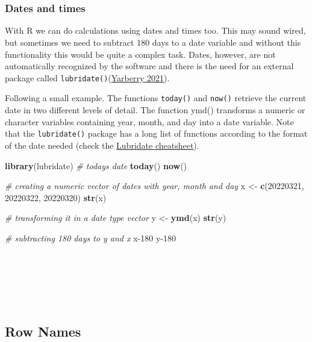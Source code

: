 \documentclass[
]{article}
\newenvironment{Shaded}{\begin{snugshade}}{\end{snugshade}}
\newcommand{\CommentTok}[1]{\textcolor[rgb]{0.56,0.35,0.01}{\textit{#1}}}
\newcommand{\DecValTok}[1]{\textcolor[rgb]{0.00,0.00,0.81}{#1}}
\newcommand{\FunctionTok}[1]{\textcolor[rgb]{0.13,0.29,0.53}{\textbf{#1}}}
\newcommand{\NormalTok}[1]{#1}
\newcommand{\OtherTok}[1]{\textcolor[rgb]{0.56,0.35,0.01}{#1}}
\begin{document}
~

~

\hypertarget{dates-and-times}{%
\subsubsection{Dates and times}\label{dates-and-times}}

With R we can do calculations using dates and times too. This may sound
wired, but sometimes we need to subtract 180 days to a date variable and
without this functionality this would be quite a complex task. Dates,
however, are not automatically recognized by the software and there is
the need for an external package called \texttt{lubridate()}(\protect\hyperlink{ref-yarberry2021}{Yarberry 2021}).

Following a small example. The functions \texttt{today()} and \texttt{now()} retrieve
the current date in two different levels of detail. The function ymd()
transforms a numeric or character variables containing year, month, and
day into a date variable. Note that the \texttt{lubridate()} package has a long
list of functions according to the format of the date needed (check the
\href{https://rawgit.com/rstudio/cheatsheets/main/lubridate.pdf}{Lubridate cheatsheet}).

\begin{Shaded}
\begin{Highlighting}[]
\FunctionTok{library}\NormalTok{(lubridate)}
\CommentTok{\# today\textquotesingle{}s date}
\FunctionTok{today}\NormalTok{()}
\FunctionTok{now}\NormalTok{()}

\CommentTok{\# creating a numeric vector of dates with year, month and day}
\NormalTok{x }\OtherTok{\textless{}{-}} \FunctionTok{c}\NormalTok{(}\DecValTok{20220321}\NormalTok{, }\DecValTok{20220322}\NormalTok{, }\DecValTok{20220320}\NormalTok{)}
\FunctionTok{str}\NormalTok{(x)}

\CommentTok{\# transforming it in a date type vector }
\NormalTok{y }\OtherTok{\textless{}{-}} \FunctionTok{ymd}\NormalTok{(x)}
\FunctionTok{str}\NormalTok{(y)}

\CommentTok{\# subtracting 180 days to y and x}
\NormalTok{x}\DecValTok{{-}180}
\NormalTok{y}\DecValTok{{-}180}
\end{Highlighting}
\end{Shaded}

~

~

~

\hypertarget{row-names}{%
\subsection{Row Names}\label{row-names}}
\end{document}
